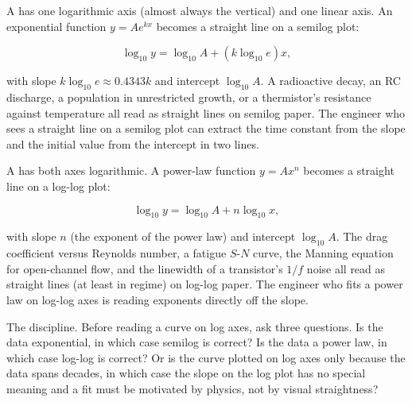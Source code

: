 A  has one logarithmic axis (almost always the
vertical) and one linear axis. An exponential function $y = A e^{kx}$
becomes a straight line on a semilog plot:

\[
\log_{10} y = \log_{10} A + (k \log_{10} e) x,
\]

with slope $k \log_{10} e \approx 0.4343 k$ and intercept $\log_{10}
A$. A radioactive decay, an RC discharge, a population in unrestricted
growth, or a thermistor's resistance against temperature all read as
straight lines on semilog paper. The engineer who sees a straight
line on a semilog plot can extract the time constant from the slope
and the initial value from the intercept in two lines.

A  has both axes logarithmic. A power-law
function $y = A x^{n}$ becomes a straight line on a log-log plot:

\[
\log_{10} y = \log_{10} A + n \log_{10} x,
\]

with slope $n$ (the exponent of the power law) and intercept
$\log_{10} A$. The drag coefficient versus Reynolds number, a fatigue
$S$-$N$ curve, the Manning equation for open-channel flow, and the
linewidth of a transistor's $1/f$ noise all read as straight lines
(at least in regime) on log-log paper. The engineer who fits a power
law on log-log axes is reading exponents directly off the slope.

The discipline. Before reading a curve on log axes, ask three
questions. Is the data exponential, in which case semilog is
correct? Is the data a power law, in which case log-log is correct?
Or is the curve plotted on log axes only because the data spans
decades, in which case the slope on the log plot has no special
meaning and a fit must be motivated by physics, not by visual
straightness?

